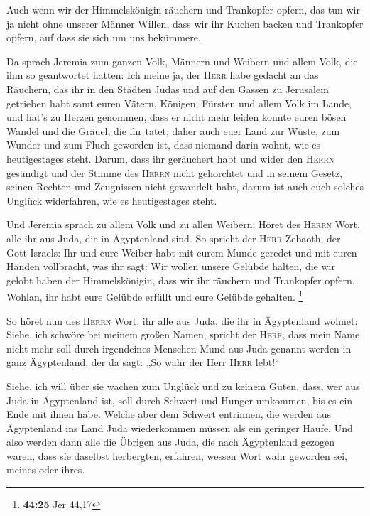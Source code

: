  Auch wenn wir der Himmelskönigin räuchern und Trankopfer
opfern, das tun wir ja nicht ohne unserer Männer Willen, dass wir ihr
Kuchen backen und Trankopfer opfern, auf dass sie sich um uns bekümmere.

 Da sprach Jeremia zum ganzen Volk, Männern und Weibern
und allem Volk, die ihm so geantwortet hatten:  Ich meine
ja, der \textsc{Herr} habe gedacht an das Räuchern, das ihr in den
Städten Judas und auf den Gassen zu Jerusalem getrieben habt samt euren
Vätern, Königen, Fürsten und allem Volk im Lande, und hat's zu Herzen
genommen,  dass er nicht mehr leiden konnte euren bösen
Wandel und die Gräuel, die ihr tatet; daher auch euer Land zur Wüste,
zum Wunder und zum Fluch geworden ist, dass niemand darin wohnt, wie es
heutigestages steht.  Darum, dass ihr geräuchert habt und
wider den \textsc{Herrn} gesündigt und der Stimme des \textsc{Herrn}
nicht gehorchtet und in seinem Gesetz, seinen Rechten und Zeugnissen
nicht gewandelt habt, darum ist auch euch solches Unglück widerfahren,
wie es heutigestages steht.

 Und Jeremia sprach zu allem Volk und zu allen Weibern:
Höret des \textsc{Herrn} Wort, alle ihr aus Juda, die in Ägyptenland
sind.  So spricht der \textsc{Herr} Zebaoth, der Gott
Israels: Ihr und eure Weiber habt mit eurem Munde geredet und mit euren
Händen vollbracht, was ihr sagt: Wir wollen unsere Gelübde halten, die
wir gelobt haben der Himmelskönigin, dass wir ihr räuchern und
Trankopfer opfern. Wohlan, ihr habt eure Gelübde erfüllt und eure
Gelübde gehalten. \footnote{\textbf{44:25} Jer 44,17}

 So höret nun des \textsc{Herrn} Wort, ihr alle aus Juda,
die ihr in Ägyptenland wohnet: Siehe, ich schwöre bei meinem großen
Namen, spricht der \textsc{Herr}, dass mein Name nicht mehr soll durch
irgendeines Menschen Mund aus Juda genannt werden in ganz Ägyptenland,
der da sagt: „So wahr der Herr \textsc{Herr} lebt!{}``

 Siehe, ich will über sie wachen zum Unglück und zu
keinem Guten, dass, wer aus Juda in Ägyptenland ist, soll durch Schwert
und Hunger umkommen, bis es ein Ende mit ihnen habe. 
Welche aber dem Schwert entrinnen, die werden aus Ägyptenland ins Land
Juda wiederkommen müssen als ein geringer Haufe. Und also werden dann
alle die Übrigen aus Juda, die nach Ägyptenland gezogen waren, dass sie
daselbst herbergten, erfahren, wessen Wort wahr geworden sei, meines
oder ihres.

